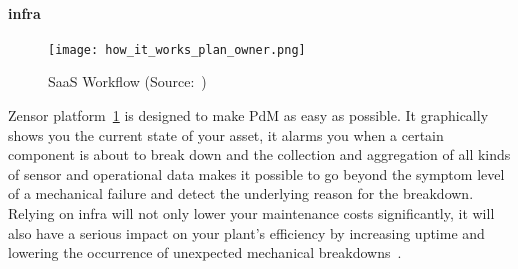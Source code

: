 \paragraph{\ac{infra}} 
\begin{figure}[ht]
    \centering
    \texttt{[image: how\_it\_works\_plan\_owner.png]}
    \caption{\acl{SaaS} Workflow (Source:~\cite{Misc:zensor_official_website})}
    \label{fig:zensor_flow}
\end{figure}
Zensor platform~\ref{fig:zensor_flow} is designed to make \ac{PdM} as easy as possible. It graphically shows you the current state of your asset, it alarms you when a certain component is about to
break down and the collection and aggregation of all kinds of sensor and operational data makes it possible to go beyond the symptom level of a mechanical failure 
and detect the underlying reason for the breakdown. Relying on \ac{infra} will not only lower your maintenance costs significantly, 
it will also have a serious impact on your plant's efficiency by increasing uptime and lowering the occurrence of unexpected mechanical breakdowns~\cite{Misc:vaningelgem_2020_what}.

